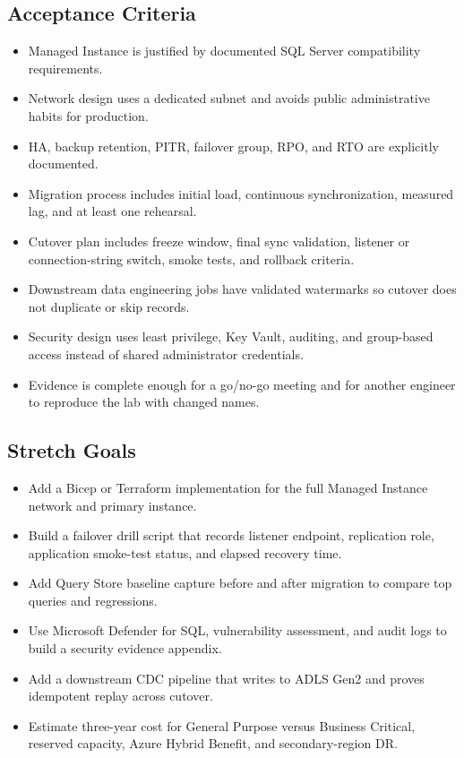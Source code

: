 \subsection*{Acceptance Criteria}
\begin{itemize}
    \item Managed Instance is justified by documented SQL Server compatibility requirements.
    \item Network design uses a dedicated subnet and avoids public administrative habits for production.
    \item HA, backup retention, PITR, failover group, RPO, and RTO are explicitly documented.
    \item Migration process includes initial load, continuous synchronization, measured lag, and at least one rehearsal.
    \item Cutover plan includes freeze window, final sync validation, listener or connection-string switch, smoke tests, and rollback criteria.
    \item Downstream data engineering jobs have validated watermarks so cutover does not duplicate or skip records.
    \item Security design uses least privilege, Key Vault, auditing, and group-based access instead of shared administrator credentials.
    \item Evidence is complete enough for a go/no-go meeting and for another engineer to reproduce the lab with changed names.
\end{itemize}

\subsection*{Stretch Goals}
\begin{itemize}
    \item Add a Bicep or Terraform implementation for the full Managed Instance network and primary instance.
    \item Build a failover drill script that records listener endpoint, replication role, application smoke-test status, and elapsed recovery time.
    \item Add Query Store baseline capture before and after migration to compare top queries and regressions.
    \item Use Microsoft Defender for SQL, vulnerability assessment, and audit logs to build a security evidence appendix.
    \item Add a downstream CDC pipeline that writes to ADLS Gen2 and proves idempotent replay across cutover.
    \item Estimate three-year cost for General Purpose versus Business Critical, reserved capacity, Azure Hybrid Benefit, and secondary-region DR.
\end{itemize}
